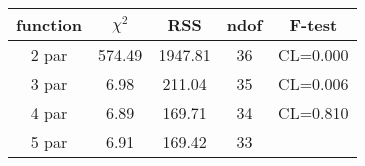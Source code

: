 \begin{tabular}{c|c|c|c|c}
function & $\chi^2$ & RSS & ndof & F-test \\
\hline
2 par & 574.49 & 1947.81 & 36 & CL=0.000 \\
3 par & 6.98 & 211.04 & 35 & CL=0.006 \\
4 par & 6.89 & 169.71 & 34 & CL=0.810 \\
5 par & 6.91 & 169.42 & 33 & \\
\hline
\end{tabular}